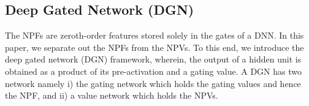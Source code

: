\subsection{Deep Gated Network (DGN)}
The NPFs are zeroth-order features stored solely in the gates of a DNN. In this paper, we separate out the NPFs from the NPVs. To this end, we introduce the deep gated network (DGN) framework, wherein, the output of a hidden unit is obtained as a product of its pre-activation and a gating value. A DGN has two network namely i) the gating network which holds the gating values and hence the NPF, and ii) a value network which holds the NPVs. %
\FloatBarrier
\begin{table}[h]
\begin{minipage}{0.5\columnwidth}
\end{minipage}
\begin{minipage}{0.5\columnwidth}
\end{minipage}
\caption{$q(l),z(l)$ and $G(l)$ are $w$-dimensional quantities. At time $t$, by specifying the gating values for all the $n$ input examples as $\G_t\stackrel{def}=\{G_{x_{s},t}(l,i), \forall s\in[n],l\in[d-1],i\in[w]\}$, we can recover the outputs $\hat{y}_t(x_s)\in \R$ for all the inputs $\{x_s\}_{s=1}^n$ in the dataset.}
\label{tb:dgn}
\end{table}
